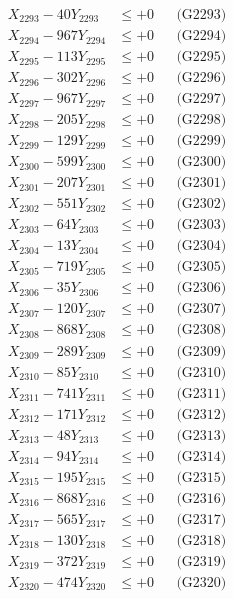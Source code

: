 \documentclass[a4paper,10pt]{article}
\begin{document}
{\begin{align}
X_{2293} - 40Y_{2293} &\leq +0 && \text{(G2293)} \\
X_{2294} - 967Y_{2294} &\leq +0 && \text{(G2294)} \\
X_{2295} - 113Y_{2295} &\leq +0 && \text{(G2295)} \\
X_{2296} - 302Y_{2296} &\leq +0 && \text{(G2296)} \\
X_{2297} - 967Y_{2297} &\leq +0 && \text{(G2297)} \\
X_{2298} - 205Y_{2298} &\leq +0 && \text{(G2298)} \\
X_{2299} - 129Y_{2299} &\leq +0 && \text{(G2299)} \\
X_{2300} - 599Y_{2300} &\leq +0 && \text{(G2300)} \\
\allowbreak
X_{2301} - 207Y_{2301} &\leq +0 && \text{(G2301)} \\
X_{2302} - 551Y_{2302} &\leq +0 && \text{(G2302)} \\
X_{2303} - 64Y_{2303} &\leq +0 && \text{(G2303)} \\
X_{2304} - 13Y_{2304} &\leq +0 && \text{(G2304)} \\
X_{2305} - 719Y_{2305} &\leq +0 && \text{(G2305)} \\
X_{2306} - 35Y_{2306} &\leq +0 && \text{(G2306)} \\
X_{2307} - 120Y_{2307} &\leq +0 && \text{(G2307)} \\
X_{2308} - 868Y_{2308} &\leq +0 && \text{(G2308)} \\
X_{2309} - 289Y_{2309} &\leq +0 && \text{(G2309)} \\
X_{2310} - 85Y_{2310} &\leq +0 && \text{(G2310)} \\
\allowbreak
X_{2311} - 741Y_{2311} &\leq +0 && \text{(G2311)} \\
X_{2312} - 171Y_{2312} &\leq +0 && \text{(G2312)} \\
X_{2313} - 48Y_{2313} &\leq +0 && \text{(G2313)} \\
X_{2314} - 94Y_{2314} &\leq +0 && \text{(G2314)} \\
X_{2315} - 195Y_{2315} &\leq +0 && \text{(G2315)} \\
X_{2316} - 868Y_{2316} &\leq +0 && \text{(G2316)} \\
X_{2317} - 565Y_{2317} &\leq +0 && \text{(G2317)} \\
X_{2318} - 130Y_{2318} &\leq +0 && \text{(G2318)} \\
X_{2319} - 372Y_{2319} &\leq +0 && \text{(G2319)} \\
X_{2320} - 474Y_{2320} &\leq +0 && \text{(G2320)} \\

\end{align}}
\end{document}
